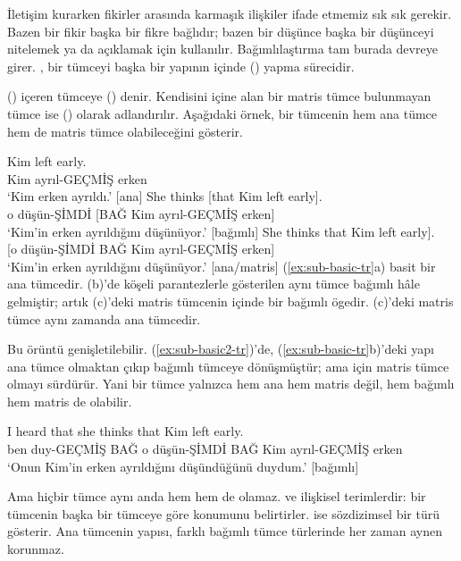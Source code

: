 İletişim kurarken fikirler arasında karmaşık ilişkiler ifade etmemiz sık sık gerekir. Bazen bir fikir başka bir fikre bağlıdır; bazen bir düşünce başka bir düşünceyi nitelemek ya da açıklamak için kullanılır. Bağımlılaştırma tam burada devreye girer. , bir tümceyi başka bir yapının içinde  () yapma sürecidir.

 () içeren tümceye  () denir. Kendisini içine alan bir matris tümce bulunmayan tümce ise  () olarak adlandırılır. Aşağıdaki örnek, bir tümcenin hem ana tümce hem de matris tümce olabileceğini gösterir.

\ea \label{ex:sub-basic-tr}
    \ea \gll Kim left early.\\
        Kim ayrıl-GEÇMİŞ erken\\
    \glt `Kim erken ayrıldı.' [ana]
    \ex \gll She thinks {[}that Kim left early{]}.\\
        o düşün-ŞİMDİ {[}BAĞ Kim ayrıl-GEÇMİŞ erken{]}\\
    \glt `Kim'in erken ayrıldığını düşünüyor.' [bağımlı]
    \ex \gll {[}She thinks that Kim left early{]}.\\
        {[}o düşün-ŞİMDİ BAĞ Kim ayrıl-GEÇMİŞ erken{]}\\
    \glt `Kim'in erken ayrıldığını düşünüyor.' [ana/matris]
    \z
\z
(\ref{ex:sub-basic-tr}a) basit bir ana tümcedir. (b)'de köşeli parantezlerle gösterilen aynı tümce bağımlı hâle gelmiştir; artık (c)'deki matris tümcenin içinde bir bağımlı ögedir. (c)'deki matris tümce aynı zamanda ana tümcedir.

Bu örüntü genişletilebilir. (\ref{ex:sub-basic2-tr})'de, (\ref{ex:sub-basic-tr}b)'deki yapı ana tümce olmaktan çıkıp bağımlı tümceye dönüşmüştür; ama  için matris tümce olmayı sürdürür. Yani bir tümce yalnızca hem ana hem matris değil, hem bağımlı hem matris de olabilir.

\ea\label{ex:sub-basic2-tr}
\gll I heard {\ob}that she thinks {\ob}that Kim left early{\cb}{\cb}.\\
    ben duy-GEÇMİŞ BAĞ o düşün-ŞİMDİ BAĞ Kim ayrıl-GEÇMİŞ erken\\
\glt `Onun Kim'in erken ayrıldığını düşündüğünü duydum.' [bağımlı]
\z

Ama hiçbir tümce aynı anda hem  hem de  olamaz.  ve  ilişkisel terimlerdir: bir tümcenin başka bir tümceye göre konumunu belirtirler.  ise sözdizimsel bir türü gösterir. Ana tümcenin yapısı, farklı bağımlı tümce türlerinde her zaman aynen korunmaz.

